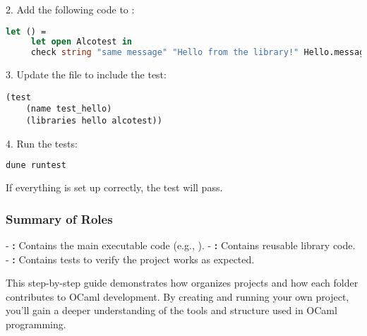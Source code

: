 2. Add the following code to :
\begin{lstlisting}[language=OCaml, caption={Test Code}]
   let () =
     let open Alcotest in
     check string "same message" "Hello from the library!" Hello.message
   \end{lstlisting}

3. Update the  file to include the test:
\begin{lstlisting}[language=PlainText, caption={Test Dune File}]
   (test
    (name test_hello)
    (libraries hello alcotest))
\end{lstlisting}

4. Run the tests:
\begin{lstlisting}[language=Bash]
   dune runtest
\end{lstlisting}

If everything is set up correctly, the test will pass.

\subsubsection{Summary of Roles}
- \textbf{:} Contains the main executable code (e.g., ).
- \textbf{:} Contains reusable library code.
- \textbf{:} Contains tests to verify the project works as expected.

This step-by-step guide demonstrates how  organizes projects and how each folder contributes to OCaml development. By creating and running your own project, you'll gain a deeper understanding of the tools and structure used in OCaml programming.


